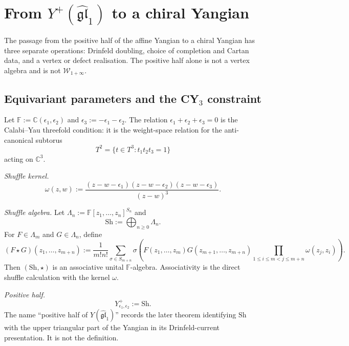 \section{From $Y^+(\widehat{\mathfrak{gl}}_1)$ to a chiral Yangian}
\label{wn:sec:yplus-to-chiral-yangian-treatise}

\providecommand{\kBKM}{\kappa_{\mathrm{BKM}}}
\providecommand{\kch}{\kappa_{\mathrm{ch}}}
\providecommand{\kcat}{\kappa_{\mathrm{cat}}}
\providecommand{\kfib}{\kappa_{\mathrm{fiber}}}
\providecommand{\gghone}{\widehat{\mathfrak{gl}}_1}
\providecommand{\Yplus}{Y^+_{\epsilon_1, \epsilon_2}}
\providecommand{\Yfull}{Y_{\epsilon_1, \epsilon_2}}
\providecommand{\Sh}{\mathrm{Sh}}
\providecommand{\Hilb}{\mathrm{Hilb}}
\providecommand{\CoHA}{\mathrm{CoHA}}
\providecommand{\Fact}{\mathrm{Fact}}
\providecommand{\ChirY}{\mathcal{Y}^{\mathrm{ch}}}

The passage from the positive half of the affine Yangian to a chiral
Yangian has three separate operations: Drinfeld doubling, choice of
completion and Cartan data, and a vertex or defect realisation. The
positive half alone is not a vertex algebra and is not
$\mathcal W_{1+\infty}$.

\subsection{Equivariant parameters and the CY$_3$ constraint}
\label{wn:subsec:yplus-setup}

Let $\mathbb{F}:=\mathbb{C}(\epsilon_1,\epsilon_2)$ and
$\epsilon_3:=-\epsilon_1-\epsilon_2$. The relation
$\epsilon_1+\epsilon_2+\epsilon_3=0$ is the Calabi--Yau threefold
condition: it is the weight-space relation for the anti-canonical
subtorus
\[
T^2=\{t\in T^3:t_1t_2t_3=1\}
\]
acting on $\mathbb C^3$.

\emph{Shuffle kernel.}
\[
\omega(z,w):=
\frac{(z-w-\epsilon_1)(z-w-\epsilon_2)(z-w-\epsilon_3)}{(z-w)^3}.
\]

\emph{Shuffle algebra.}
Let $\Lambda_n:=\mathbb F[z_1,\ldots,z_n]^{S_n}$ and
\[
\Sh:=\bigoplus_{n\ge0}\Lambda_n.
\]
For $F\in\Lambda_m$ and $G\in\Lambda_n$, define
\[
(F\star G)(z_1,\ldots,z_{m+n})
:=
\frac{1}{m!n!}\sum_{\sigma\in S_{m+n}}
\sigma\!\left(
F(z_1,\ldots,z_m)G(z_{m+1},\ldots,z_{m+n})
\prod_{1\le i\le m<j\le m+n}\omega(z_j,z_i)
\right).
\]
Then $(\Sh,\star)$ is an associative unital $\mathbb F$-algebra.
Associativity is the direct shuffle calculation with the kernel
$\omega$.

\emph{Positive half.}
\[
\Yplus:=\Sh.
\]
The name ``positive half of $Y(\gghone)$'' records the later theorem
identifying $\Sh$ with the upper triangular part of the Yangian in its
Drinfeld-current presentation. It is not the definition.

